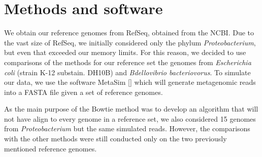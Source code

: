\documentclass[12pt]{article} %
\begin{document}
\section{Methods and software}
We obtain our reference genomes from RefSeq, obtained from the NCBI. Due to the vast size of RefSeq, we initially considered only the phylum \emph{Proteobacterium}, but even that exceeded our memory limits. For this reason, we decided to use comparisons of the methods for our reference set the genomes from \emph{Escherichia coli} (strain K-12 substain. DH10B) and  \emph{Bdellovibrio bacteriovorus}. To simulate our data, we use the software MetaSim [\cite{Richter:2008dg}] which will generate metagenomic reads into a FASTA file given a set of reference genomes.
\par
As the main purpose of the Bowtie method was to develop an algorithm that will not have align to every genome in a reference set, we also considered 15 genomes from \emph{Proteobacterium} but the same simulated reads. However, the comparisons with the other methods were still conducted only on the two previously mentioned reference genomes.
\end{document}
